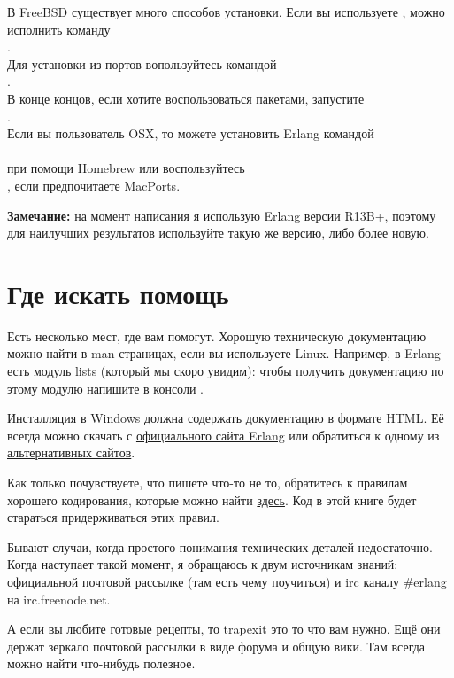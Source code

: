 В FreeBSD существует много способов установки.
Если вы используете , можно исполнить команду\\ 
.\\ 
Для установки из портов вопользуйтесь командой\\ 
.\\ 
В конце концов, если хотите воспользоваться пакетами, запустите\\  
.\\ 
Если вы пользователь OSX, то можете установить Erlang командой\\ 
\\ 
при помощи Homebrew или воспользуйтесь\\ 
, если предпочитаете MacPorts.\\ 
\colorbox{lgray}
{
\begin{minipage}{1.0\linewidth}
\textbf{Замечание:} на момент написания я использую Erlang версии R13B+, поэтому для наилучших результатов используйте такую же версию, либо более новую.
\end{minipage}
}
\section{Где искать помощь}
Есть несколько мест, где вам помогут.
Хорошую техническую документацию можно найти в man страницах, если вы используете Linux.
Например, в Erlang есть модуль lists (который мы скоро увидим): чтобы получить документацию по этому модулю напишите в консоли .

Инсталляция в Windows должна содержать документацию в формате HTML.
Её всегда можно скачать с \href{http://erlang.org/doc/}{официального сайта Erlang} или обратиться к одному из \href{http://erldocs.com}{альтернативных сайтов}.

Как только почувствуете, что пишете что\--то не то, обратитесь к правилам хорошего кодирования, которые можно найти \href{http://www.erlang.se/doc/programming_rules.shtml}{здесь}.
Код в этой книге будет стараться придерживаться этих правил.

Бывают случаи, когда простого понимания технических деталей недостаточно.
Когда наступает такой момент, я обращаюсь к двум источникам знаний: официальной \href{http://www.erlang.org/static/doc/mailinglist.html}{почтовой рассылке} (там есть чему поучиться) и irc каналу \#erlang на irc.freenode.net.

А если вы любите готовые рецепты, то \href{http://trapexit.org}{trapexit} это то что вам нужно.
Ещё они держат зеркало почтовой рассылки в виде форума и общую вики.
Там всегда можно найти что\--нибудь полезное.
